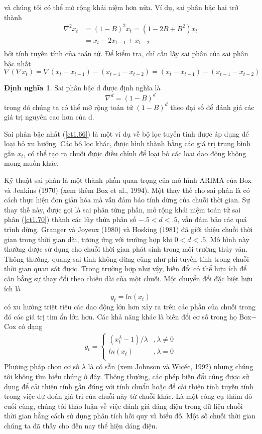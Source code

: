 \documentclass[12pt, a4paper,oneside]{book}
\theoremstyle{definition}
\newtheorem{dn}[theo]{Định nghĩa}
\begin{document}
và chúng tôi có thể mở rộng khái niệm hơn nữa. Ví dụ, sai phân bậc hai trở thành
\begin{align*}
\nabla^{2} x_{t} &=(1-B)^{2}x_{t}=(1-2B+B^{2})x_{t}\\
&=x_{t}-2x_{t-1}+x_{t-2}\\	
\end{align*}
bởi tính tuyến tính của toán tử. Để kiểm tra, chỉ cần lấy sai phân của sai phân bậc nhất
$\nabla(\nabla x_{t})=\nabla (x_{t}-x_{t-1})- (x_{t-1}-x_{t-2})=(x_{t}-x_{t-1})-(x_{t-1}-x_{t-2})$
\begin{dn}
	Sai phân bậc d được định nghĩa là
	\begin{equation}
	\nabla^{d}=(1-B)^{d} \label{ct1.70}
	\end{equation}
	trong đó chúng ta có thể mở rộng toán tử $ (1-B)^{d} $ theo đại số để đánh giá các giá trị nguyên cao hơn của d. 
\end{dn}
Sai phân bậc nhất (\ref{ct1.66}) là một ví dụ về bộ lọc tuyến tính được áp dụng để loại bỏ xu hướng. Các bộ lọc khác, được hình thành bằng các giá trị trung bình gần $ x_{t} $, có thể tạo ra chuỗi được điều chỉnh để loại bỏ các loại dao động không mong muốn khác. 

Kỹ thuật sai phân là một thành phần quan trọng của mô hình ARIMA của Box và Jenkins (1970) (xem thêm Box et al., 1994).
Một thay thế cho sai phân là có cách thực hiện đơn giản hóa mà vẫn đảm báo tính dừng của chuỗi thời gian. Sự thay thế này, được gọi là sai phân từng phần, mở rộng khái niệm toán tử sai phân (\ref{ct1.70}) thành các lũy thừa phân số $ −.5 <d <.5 $, vẫn đảm bảo các quá trình dừng. Granger và Joyeux (1980) và Hosking (1981) đã giới thiệu chuỗi thời gian trong thời gian dài, tương ứng với trường hợp khi $ 0 <d <.5 $. Mô hình này thường được sử dụng cho chuỗi thời gian phát sinh trong môi trường thủy văn.
Thông thường, quang sai tính không dừng cũng như phi tuyến tính trong chuỗi thời gian quan sát được. Trong trường hợp như vậy, biến đổi có thể hữu ích để cân bằng sự thay đổi theo chiều dài của một chuỗi. Một chuyển đổi đặc biệt hữu ích là
\begin{equation}
y_{t}=ln(x_{t}) \label{ct1.71}
\end{equation}
có xu hướng triệt tiêu các dao động lớn hơn xảy ra trên các phần của chuỗi trong đó các giá trị tìm ẩn lớn hơn. Các khả năng khác là biến đổi cơ số trong họ Box$-$Cox có dạng
\begin{align}
y_{t}=
\begin{cases} 
(x_{t}^{\lambda}-1)/\lambda&, \lambda\neq 0\\
ln(x_{t})&, \lambda=0\\
\end{cases}
\label{BC}
\end{align}
Phương pháp chọn cơ số $ \lambda $ là có sẵn (xem Johnson và Wicéc, 1992) nhưng chúng tôi không tìm hiểu chúng ở đây. Thông thường, các phép biến đổi cũng được sử dụng để cải thiện tính gần đúng với tính chuẩn hoặc để cải thiện tính tuyến tính trong việc dự đoán giá trị của chuỗi này từ chuỗi khác.
Là một công cụ thăm dò cuối cùng, chúng tôi thảo luận về việc đánh giá dáng điệu trong dữ liệu chuỗi thời gian bằng cách sử dụng phân tích hồi quy và biểu đồ. Một số chuỗi thời gian chúng ta đã thấy cho đến nay thể hiện dáng điệu. 
\end{document}
